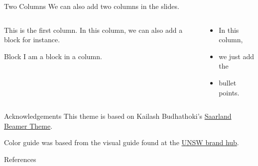 \documentclass[aspectratio=169]{beamer}
\begin{document}
	\begin{frame}{Two Columns}
		We can also add two columns in the slides.
		\begin{columns}[t]
			\begin{column}[T]{0.4\textwidth}
				This is the first column. In this column, we can also add a block for instance.
				\vspace{1em}
				\begin{block}{Block}
					I am a block in a column.
				\end{block}
			\end{column}
			\begin{column}[T]{0.4\textwidth}
				\begin{itemize}
					\item In this column,
					\item we just add the
					\item bullet points.
				\end{itemize}
			\end{column}
		\end{columns}
	\end{frame}
	\begin{frame}{Acknowledgements}
		This theme is based on Kailash Budhathoki's \href{https://github.com/kailashbuki/beamerthemesaarland}{Saarland Beamer Theme}.
		
		Color guide was based from the visual guide found at the \href{https://www.brand.unsw.edu.au/download/}{UNSW brand hub}.
	\end{frame}

  \begin{frame}[allowframebreaks]{References}
    
    \nocite{*}
    
  \end{frame}
\end{document}
